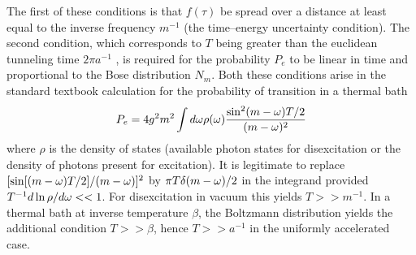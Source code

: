  The first of these conditions is  that $f(\tau)$ be spread
over a distance at least equal to the inverse frequency $m^{-1}$ (the
time--energy uncertainty condition). The second condition, which corresponds to
$T$ being greater than the euclidean tunneling time $2 \pi a^{-1}$ \cite{pbt},
is
required for the probability $P_{e}$ to be linear in time and proportional to
the Bose distribution $N_m$. Both these conditions arise in the
standard textbook calculation for the probability of transition in a thermal
bath \begin{equation}
P_e= 4
g^2
m^2
\int
d\mbox{$ \omega $}
\rho (\mbox{$ \omega $}) {\sin^2(m-\mbox{$ \omega $})T/2 \over (m-\mbox{$ \omega $})^2}
\label{golder}
\end{equation}
 where $\rho$ is the density of states
(available  photon states for disexcitation or the density of photons present
for excitation). It is legitimate to
replace  $[\sin[(m-\mbox{$ \omega $})T/2] / (m-\mbox{$ \omega $})]^2$ by $
\pi T \delta (m-\mbox{$ \omega $})/2$ in the integrand provided $T^{-1}d \ln \rho / d \mbox{$ \omega $}
<<1$. For disexcitation in vacuum this yields $T>>m^{-1}$. In a thermal bath at
inverse temperature $\beta$, the Boltzmann distribution yields the additional
condition
$T>> \beta$, hence $T>>a^{-1}$ in the uniformly accelerated case.

